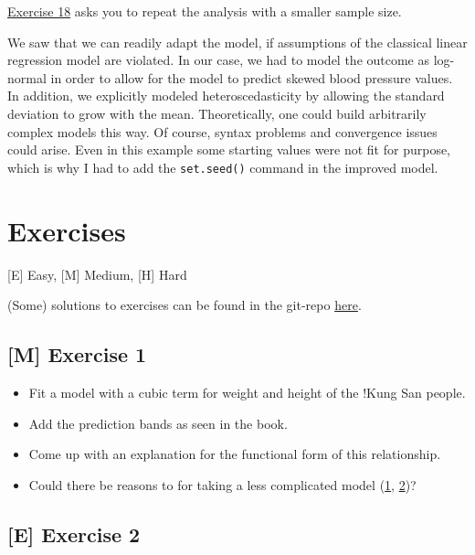 \documentclass[
]{book}
\providecommand{\tightlist}{%
  \setlength{\itemsep}{0pt}\setlength{\parskip}{0pt}}
\begin{document}
\hyperref[exercise18_multiple_regression]{Exercise 18} asks you to repeat the analysis
with a smaller sample size.

We saw that we can readily adapt the model, if assumptions of the classical
linear regression model are violated. In our case, we had to model the outcome
as log-normal in order to allow for the model to predict skewed blood pressure values.
In addition, we explicitly modeled heteroscedasticity by allowing the standard deviation
to grow with the mean. Theoretically, one could build arbitrarily complex models
this way. Of course, syntax problems and convergence issues could arise.
Even in this example some starting values were not fit for purpose, which is why
I had to add the \texttt{set.seed()} command in the improved model.

\section{Exercises}\label{exercises-2}

{[}E{]} Easy, {[}M{]} Medium, {[}H{]} Hard

(Some) solutions to exercises can be found in the git-repo \href{https://github.com/jdegenfellner/Script_QM2_ZHAW/tree/main/Solutions_Exercises}{here}.

\subsection{{[}M{]} Exercise 1}\label{exercise1_multiple_regression}

\begin{itemize}
\tightlist
\item
  Fit a model with a cubic term for weight and height of the !Kung San people.
\item
  Add the prediction bands as seen in the book.
\item
  Come up with an explanation for the functional form of this relationship.
\item
  Could there be reasons to for taking a less complicated model
  (\href{https://en.wikipedia.org/wiki/Statistical_model_specification}{1}, \href{https://en.wikipedia.org/wiki/Occam\%27s_razor}{2})?
\end{itemize}

\subsection{{[}E{]} Exercise 2}\label{exercise2_multiple_regression}
\end{document}
